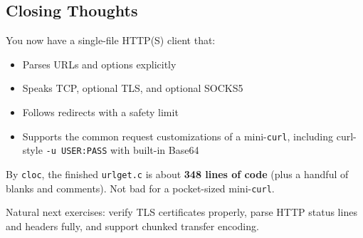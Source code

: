 \subsection{Closing Thoughts}

You now have a single-file HTTP(S) client that:

\begin{itemize}[leftmargin=1.4em]
    \item Parses URLs and options explicitly
    \item Speaks TCP, optional TLS, and optional SOCKS5
    \item Follows redirects with a safety limit
    \item Supports the common request customizations of a mini-\texttt{curl},
          including curl-style \texttt{-u USER:PASS} with built-in Base64
\end{itemize}

By \texttt{cloc}, the finished \texttt{urlget.c} is about \textbf{348 lines of
code} (plus a handful of blanks and comments). Not bad for a pocket-sized
mini-\texttt{curl}.

Natural next exercises: verify TLS certificates properly, parse HTTP status
lines and headers fully, and support chunked transfer encoding.
